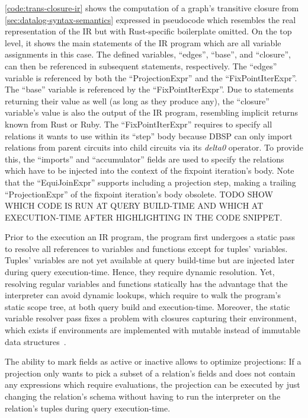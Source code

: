 \ref{code:trans-closure-ir} shows the computation of a graph's transitive closure
from \ref{sec:datalog-syntax-semantics} expressed in pseudocode which resembles
the real representation of the \ac{IR} but with Rust-specific boilerplate omitted.
On the top level, it shows the main statements of the \ac{IR} program which
are all variable assignments in this case.
The defined variables, ``edges'', ``base'', and ``closure'', can then be referenced
in subsequent statements, respectively.
The ``edges'' variable is referenced by both the ``ProjectionExpr'' and the
``FixPointIterExpr''.
The ``base'' variable is referenced by the ``FixPointIterExpr''.
Due to statements returning their value as well (as long as they produce any),
the ``closure'' variable's value is also the output of the \ac{IR} program,
resembling implicit returns known from Rust or Ruby.
The ``FixPointIterExpr'' requires to specify all relations it wants to use within
its ``step'' body because DBSP can only import relations from parent circuits
into child circuits via its \emph{delta0} operator.
To provide this, the ``imports'' and ``accumulator'' fields are used to
specify the relations which have to be injected into the context of the fixpoint
iteration's body.
Note that the ``EquiJoinExpr'' supports including a projection step,
making a trailing ``ProjectionExpr'' of the fixpoint iteration's body obsolete.
TODO SHOW WHICH CODE IS RUN AT QUERY BUILD-TIME AND WHICH AT EXECUTION-TIME
AFTER HIGHLIGHTING IN THE CODE SNIPPET.

Prior to the execution an \ac{IR} program, the program first undergoes a
static pass to resolve all references to variables and functions except for
tuples' variables.
Tuples' variables are not yet available at query build-time but are injected
later during query execution-time. Hence, they require dynamic resolution.
Yet, resolving regular variables and functions statically has the advantage that
the interpreter can avoid dynamic lookups, which require to walk the program's
static scope tree, at both query build and execution-time.
Moreover, the static variable resolver pass fixes a problem with closures
capturing their environment, which exists if environments are implemented with
mutable instead of immutable data structures~\cite{nystrom2021crafting}.

The ability to mark fields as active or inactive allows to optimize projections:
If a projection only wants to pick a subset of a relation's fields and does not
contain any expressions which require evaluations, the projection can be executed
by just changing the relation's schema without having to run the interpreter
on the relation's tuples during query execution-time.


